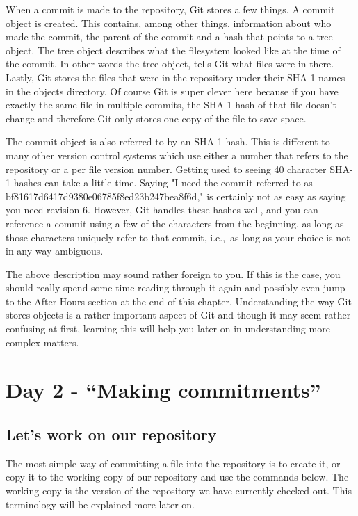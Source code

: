 When a commit is made to the repository, Git stores a few things.
A commit object is created.
This contains, among other things, information about who made the commit, the parent of the commit and a hash that points to a tree object.
The tree object describes what the filesystem looked like at the time of the commit.
In other words the tree object, tells Git what files were in there.
Lastly, Git stores the files that were in the repository under their SHA-1 names in the objects directory.
Of course Git is super clever here because if you have exactly the same file in multiple commits, the SHA-1 hash of that file doesn't change and therefore Git only stores one copy of the file to save space.

The commit object is also referred to by an SHA-1 hash.
This is different to many other version control systems which use either a number that refers to the repository or a per file version number.
Getting used to seeing 40 character SHA-1 hashes can take a little time.
Saying "I need the commit referred to as bf81617d6417d9380e06785f8ed23b247bea8f6d," is certainly not as easy as saying you need revision 6.
However, Git handles these hashes well, and you can reference a commit using a few of the characters from the beginning, as long as those characters uniquely refer to that commit, i.e.,\ as long as your choice is not in any way ambiguous.

The above description may sound rather foreign to you.
If this is the case, you should really spend some time reading through it again and possibly even jump to the After Hours section at the end of this chapter.
Understanding the way Git stores objects is a rather important aspect of Git and though it may seem rather confusing at first,
learning this will help you later on in understanding more complex matters.

\section{Day 2 - ``Making commitments''}
\subsection{Let's work on our repository}

The most simple way of committing a file into the repository is to create it, or copy it to the working copy of our repository and use the commands below.
The working copy is the version of the repository we have currently checked out.
This terminology will be explained more later on.

